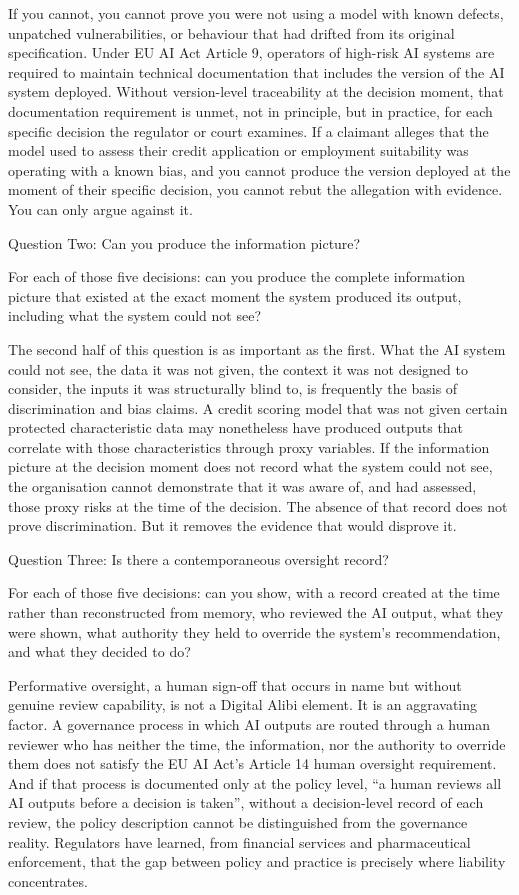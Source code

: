 If you cannot, you cannot prove you were not using a model with known defects, unpatched vulnerabilities, or behaviour that had drifted from its original specification. Under EU AI Act Article 9, operators of high-risk AI systems are required to maintain technical documentation that includes the version of the AI system deployed. Without version-level traceability at the decision moment, that documentation requirement is unmet, not in principle, but in practice, for each specific decision the regulator or court examines. If a claimant alleges that the model used to assess their credit application or employment suitability was operating with a known bias, and you cannot produce the version deployed at the moment of their specific decision, you cannot rebut the allegation with evidence. You can only argue against it.

Question Two: Can you produce the information picture?

For each of those five decisions: can you produce the complete information picture that existed at the exact moment the system produced its output, including what the system could not see?

The second half of this question is as important as the first. What the AI system could not see, the data it was not given, the context it was not designed to consider, the inputs it was structurally blind to, is frequently the basis of discrimination and bias claims. A credit scoring model that was not given certain protected characteristic data may nonetheless have produced outputs that correlate with those characteristics through proxy variables. If the information picture at the decision moment does not record what the system could not see, the organisation cannot demonstrate that it was aware of, and had assessed, those proxy risks at the time of the decision. The absence of that record does not prove discrimination. But it removes the evidence that would disprove it.

Question Three: Is there a contemporaneous oversight record?

For each of those five decisions: can you show, with a record created at the time rather than reconstructed from memory, who reviewed the AI output, what they were shown, what authority they held to override the system's recommendation, and what they decided to do?

Performative oversight, a human sign-off that occurs in name but without genuine review capability, is not a Digital Alibi element. It is an aggravating factor. A governance process in which AI outputs are routed through a human reviewer who has neither the time, the information, nor the authority to override them does not satisfy the EU AI Act's Article 14 human oversight requirement. And if that process is documented only at the policy level, ``a human reviews all AI outputs before a decision is taken'', without a decision-level record of each review, the policy description cannot be distinguished from the governance reality. Regulators have learned, from financial services and pharmaceutical enforcement, that the gap between policy and practice is precisely where liability concentrates.

